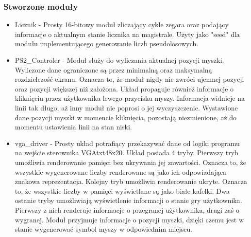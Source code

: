 \documentclass[polish,polish,a4paper]{article}
\begin{document}
\subsubsection{Stworzone moduły}
\begin{itemize}
 \item
  Licznik - Prosty 16-bitowy moduł zliczający cykle zegara oraz podający informacje o aktualnym stanie licznika na magistrale.
  Użyty jako "seed" dla modułu implementującego generowanie liczb pseudolosowych.

 \item
  PS2\_Controler - Moduł służy do wyliczania aktualnej pozycji myszki.
  Wyliczone dane ograniczone są przez minimalną oraz maksymalną rozdzielczość ekranu.
  Oznacza to, że moduł nigdy nie zwróci ujemnej pozycji oraz pozycji większej niż założona.
  Układ propaguje również informacje o kliknięciu przez użytkownika lewego przycisku myszy.
  Informacja widnieje na linii tak długo, aż inny moduł nie poprosi o jej wyczyszczenie.
  Wystawione dane pozycji myszki w momencie kliknięcia, pozostają niezmienione, aż do momentu ustawienia linii na stan niski. 

 \item
  vga\_driver - Prosty układ potrafiący przekazywać dane od logiki programu na wejście sterownika VGAtxt48x20.
  Układ posiada 4 tryby.
  Pierwszy tryb umożliwia renderowanie pamięci bez ukrywania jej zawartości.
  Oznacza to, że wszystkie wygenerowane liczby renderowane są jako ich odpowiadająca znakowa reprezentacja.
  Kolejny tryb umożliwia renderowanie ukryte.
  Oznacza to, że wszystkie liczby w pamięci wyświetlane są jako białe kafelki.
  Dwa ostanie tryby umożliwiają wyświetlenie informacji o stanie gry użytkownika.
  Pierwszy z nich renderuje informacje o przegranej użytkownika, drugi zaś o wygranej.
  Moduł przyjmuje informacje o pozycji myszki, dzięki czemu jest w stanie wygenerować symbol myszy w odpowiednim miejscu.

\end{itemize}
\end{document}
